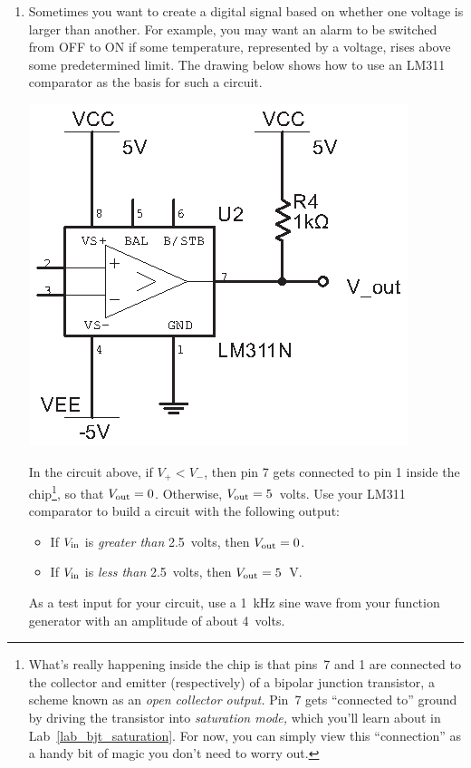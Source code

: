 \begin{enumerate}[wide]

\item \label{part_comparator} Sometimes you want to create a digital signal based on whether one voltage is larger than another.  For example, you may want an alarm to be switched from OFF to ON if some temperature, represented by a voltage, rises above some predetermined limit. The drawing below shows how to use an LM311 comparator as the basis for such a circuit.  

\begin{center}
\includegraphics{digital_electronics/basic_lm311.eps}
\end{center}

In the circuit above, if $V_+<V_-$, then pin 7 gets connected to pin 1 inside the chip\footnote{What's really happening inside the chip is that pins~7 and 1 are connected to the collector and emitter (respectively) of a bipolar junction transistor, a scheme known as an \textit{open collector output.}  Pin~7 gets ``connected to'' ground by driving the transistor into \textit{saturation mode,} which you'll learn about in Lab~\ref{lab_bjt_saturation}.  For now, you can simply view this ``connection'' as a handy bit of magic you don't need to worry out.}, so that $V_{\rm out}=0$.  Otherwise, $V_{\rm out}=5$~volts.  Use your LM311 comparator to build a circuit with the following output: 
\begin{itemize}[nosep]
\item If $V_{\rm in}$ is \textit{greater than} 2.5~volts, then $V_{\rm out}=0$.
\item If $V_{\rm in}$ is \textit{less than} 2.5~volts, then $V_{\rm out}=5$~V.
\end{itemize}
As a test input for your circuit, use a 1~kHz sine wave from your function generator with an amplitude of about 4~volts.



\end{enumerate}
